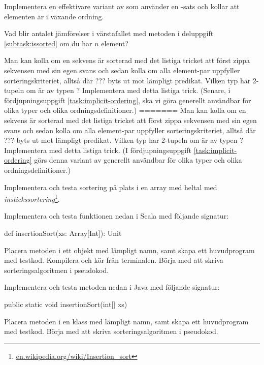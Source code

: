 \Subtask\label{subtask:issorted} Implementera en effektivare variant av  som använder en -sats och kollar att elementen är i växande ordning.

\Subtask\Pen Vad blir antalet jämförelser i värstafallet med metoden i deluppgift \ref{subtask:issorted} om du har $n$ element?


\Subtask \label{subtask:isSorted-zip} Man kan kolla om en sekvens är sorterad med det listiga tricket att först zippa sekvensen med sin egen svans och sedan kolla om alla element-par uppfyller sorteringskriteriet, alltså  där ??? byts ut mot lämpligt predikat. Vilken typ har 2-tupeln  om  är av typen ? Implementera  med detta listiga trick. (Senare, i fördjupningsuppgift \ref{task:implicit-ordering}, ska vi göra  generellt användbar för olika typer och olika ordningsdefinitioner.)
=======
\Subtask \label{subtask:isSorted-zip} Man kan kolla om en sekvens är sorterad med det listiga tricket att först zippa sekvensen med sin egen svans och sedan kolla om alla element-par uppfyller sorteringskriteriet, alltså  där ??? byts ut mot lämpligt predikat. Vilken typ har 2-tupeln  om  är av typen ? Implementera  med detta listiga trick. (I fördjupningsuppgift \ref{task:implicit-ordering} görs denna variant av  generellt användbar för olika typer och olika ordningsdefinitioner.)


\Task Implementera och testa sortering på plats i en array med heltal med \emph{instickssortering}\footnote{\href{https://en.wikipedia.org/wiki/Insertion_sort}{en.wikipedia.org/wiki/Insertion\_sort}}. 

\Subtask Implementera och testa funktionen nedan i Scala med följande signatur:
\begin{Code}
  def insertionSort(xs: Array[Int]): Unit 
\end{Code}
Placera metoden i ett objekt med lämpligt namn, samt skapa ett huvudprogram med testkod. Kompilera och kör från terminalen. Börja med att skriva sorteringsalgoritmen i pseudokod.

\Subtask Implementera och testa metoden nedan i Java med följande signatur:
\begin{Code}[language=Java]
  public static void insertionSort(int[] xs) 
\end{Code}
Placera metoden i en klass med lämpligt namn, samt skapa ett huvudprogram med testkod. Börja med att skriva sorteringsalgoritmen i pseudokod.

